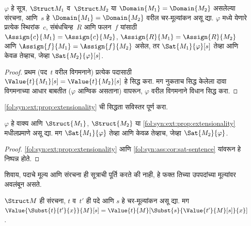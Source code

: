 \begin{prop}[विस्तारात्मकता]
  \label{fol:syn:ext:prop:extensionality}
  $\varphi$ हे सूत्र, $\Struct M_1$ व~$\Struct M_2$ या
  $\Domain{M_1} = \Domain{M_2}$ असलेल्या संरचना, आणि~$s$ हे
  $\Domain{M_1} = \Domain{M_2}$ वरील चर-मूल्यांकन असू द्या. $\varphi$ मध्ये
  येणारे प्रत्येक स्थिरांक~$c$, संबंधचिन्ह~$R$ आणि फलन~$f$
  यांसाठी $\Assign{c}{M_1} = \Assign{c}{M_2}$,
  $\Assign{R}{M_1}=\Assign{R}{M_2}$ आणि
  $\Assign{f}{M_1} = \Assign{f}{M_2}$ असेल, तर
  $\Sat{M_1}{\varphi}[s]$ तेव्हा आणि केवळ तेव्हाच, जेव्हा
  $\Sat{M_2}{\varphi}[s]$.
\end{prop}

\begin{proof}
  प्रथम (पद~$t$ वरील विगमनाने) प्रत्येक पदासाठी
  $\Value{t}{M_1}[s] = \Value{t}{M_2}[s]$ हे सिद्ध करा. मग नुकताच
  सिद्ध केलेला दावा विगमनाच्या आधार बाबतीत ($\varphi$ आण्विक असताना) वापरून,
  $\varphi$ वरील विगमनाने विधान सिद्ध करा.
\end{proof}

\begin{prob}
\ref{fol:syn:ext:prop:extensionality} ची सिद्धता सविस्तर पूर्ण करा.
\end{prob}

\begin{cor}[वाक्ये साठी विस्तारात्मकता]
  \label{fol:syn:ext:cor:extensionality-sent}
  $\varphi$ हे वाक्य आणि $\Struct{M_1}$, $\Struct{M_2}$ या
  \ref{fol:syn:ext:prop:extensionality} मधीलप्रमाणे असू द्या. मग
  $\Sat{M_1}{\varphi}$ तेव्हा आणि केवळ तेव्हाच, जेव्हा $\Sat{M_2}{\varphi}$.
\end{cor}

\begin{proof}
\ref{fol:syn:ext:prop:extensionality} आणि \ref{fol:syn:ass:cor:sat-sentence} यांवरून
हे निष्पन्न होते.
\end{proof}

शिवाय, पदाचे मूल्य आणि संरचना ही सूत्राची पूर्ति करते की
नाही, हे फक्त तिच्या उपपदांच्या मूल्यांवर अवलंबून असते.

\begin{prop}\label{fol:syn:ext:prop:ext-terms}
$\Struct M$ ही संरचना, $t$ व~$t'$ ही पदे आणि $s$ हे
चर-मूल्यांकन असू द्या. मग $\Value{\Subst{t}{t'}{x}}{M}[s] =
\Value{t}{M}[\Subst{s}{\Value{t'}{M}[s]}{x}]$.
\end{prop}


